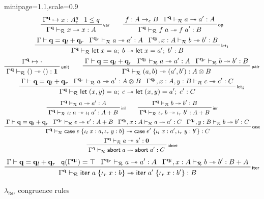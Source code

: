 \documentclass[acmsmall,screen,anonymous,review]{acmart}
\newcommand{\mc}[1]{\ensuremath{\mathcal{#1}}}
\newcommand{\mb}[1]{\ensuremath{\mathbf{#1}}}
\newcommand{\ms}[1]{\ensuremath{\mathsf{#1}}}
\newcommand{\lto}{:}
\newcommand{\linl}[1]{\iota_l\;{#1}}
\newcommand{\linr}[1]{\iota_r\;{#1}}
\newcommand{\labort}[1]{\ms{abort}\;{#1}}
\newcommand{\letexpr}[3]{\ensuremath{\ms{let}\;#1 = #2;\;#3}}
\newcommand{\caseexpr}[5]{\ms{case}\;#1\;\{\linl{#2} \lto #3, \linr{#4} \lto #5\}}
\newcommand{\liter}[3]{\ms{iter}\;#1\;\{ \linr{#2} \lto #3 \}}
\newcommand{\qsp}[4]{#1 \vdash #2 = #3 + #4}
\newcommand{\cwk}[2]{#1 \mapsto #2}
\newcommand{\rle}[1]{{\scriptsize\textsf{#1}}}
\newcommand{\tref}{\twoheadrightarrow}
\newcommand{\tmle}[5]{#1 \vdash_{#2} #3 \tref #4 : {#5}}
\newcommand{\subiterexp}{\texorpdfstring{\(\lambda_{\ms{iter}}\)}{lambda-iter}}
\newcommand{\alquant}{\ms{q}}
\begin{document}
\begin{figure}
  \begin{adjustbox}{minipage=1.1\textwidth,scale=0.9}
  \begin{gather*}
    \prftree[r]{\rle{var}}
      {\cwk{\Gamma^{\mb{q}}}{x : A^q_\epsilon}}
      {1 \leq q}
      {\tmle{\Gamma^{\mb{q}}}{\mc{R}}{x}{x}{A}} \qquad
    \prftree[r]{\rle{op}}
      {f : A \to_\epsilon B}
      {\tmle{\Gamma^{\mb{q}}}{\mc{R}}{a}{a'}{A}}
      {\tmle{\Gamma^{\mb{q}}}{\mc{R}}{f\;a}{f\;a'}{B}} \\
    \prftree[r]{\rle{let$_1$}}
      {\qsp{\Gamma}{\mb{q}}{\mb{q}_l}{\mb{q}_r}}
      {\tmle{\Gamma^{\mb{q}_r}}{\mc{R}}{a}{a'}{A}}
      {\tmle{\Gamma^{\mb{q}_l}, x : A}{\mc{R}}{b}{b'}{B}}
      {\tmle{\Gamma^{\mb{q}}}{\mc{R}}{\letexpr{x}{a}{b}}{\letexpr{x}{a'}{b'}}{B}} \\
    \prftree[r]{\rle{unit}}
      {\cwk{\Gamma^{\mb{q}}}{\cdot}}
      {\tmle{\Gamma^{\mb{q}}}{\mc{R}}{()}{()}{\mb{1}}} \qquad
    \prftree[r]{\rle{pair}}
      {\qsp{\Gamma}{\mb{q}}{\mb{q}_l}{\mb{q}_r}}
      {\tmle{\Gamma^{\mb{q}_l}}{\mc{R}}{a}{a'}{A}}
      {\tmle{\Gamma^{\mb{q}_r}}{\mc{R}}{b}{b'}{B}}
      {\tmle{\Gamma^{\mb{q}}}{\mc{R}}{(a, b)}{(a', b')}{A \otimes B}} \\
    \prftree[r]{\rle{let$_2$}}
      {\qsp{\Gamma}{\mb{q}}{\mb{q}_l}{\mb{q}_r}}
      {\tmle{\Gamma^{\mb{q}_r}}{\mc{R}}{a}{a'}{A \otimes B}}
      {\tmle{\Gamma^{\mb{q}_l}, x : A, y : B}{\mc{R}}{c}{c'}{C}}
      {\tmle{\Gamma^{\mb{q}}}{\mc{R}}{\letexpr{(x, y)}{a}{c}}{\letexpr{(x, y)}{a'}{c'}}{C}}
  \end{gather*}
  \begin{gather*}
    \prftree[r]{\rle{inl}}
      {\tmle{\Gamma^{\mb{q}}}{\mc{R}}{a}{a'}{A}}
      {\tmle{\Gamma^{\mb{q}}}{\mc{R}}{\linl{a}}{\linl{a'}}{A + B}} \qquad
    \prftree[r]{\rle{inr}}
      {\tmle{\Gamma^{\mb{q}}}{\mc{R}}{b}{b'}{B}}
      {\tmle{\Gamma^{\mb{q}}}{\mc{R}}{\linr{b}}{\linr{b'}}{A + B}} \\
    \prftree[r]{\rle{case}}
      {\qsp{\Gamma}{\mb{q}}{\mb{q}_l}{\mb{q}_r}}
      {\tmle{\Gamma^{\mb{q}_r}}{\mc{R}}{e}{e'}{A + B}}
      {\tmle{\Gamma^{\mb{q}_l}, x : A}{\mc{R}}{a}{a'}{C}}
      {\tmle{\Gamma^{\mb{q}_l}, y : B}{\mc{R}}{b}{b'}{C}}
      {\tmle{\Gamma^{\mb{q}}}{\mc{R}}
        {\caseexpr{e}{x}{a}{y}{b}}{\caseexpr{e'}{x}{a'}{y}{b'}}{C}} \\
    \prftree[r]{\rle{abort}}
      {\tmle{\Gamma^{\mb{q}}}{\mc{R}}{a}{a'}{\mb{0}}}
      {\tmle{\Gamma^{\mb{q}}}{\mc{R}}{\labort{a}}{\labort{a'}}{C}}
  \end{gather*}
  \begin{gather*}
    \prftree[r]{\rle{iter}}
      {\qsp{\Gamma}{\mb{q}}{\mb{q}_l}{\mb{q}_r}}
      {\alquant(\Gamma^{\mb{q}_l}) = \top}
      {\tmle{\Gamma^{\mb{q}_r}}{\mc{R}}{a}{a'}{A}}
      {\tmle{\Gamma^{\mb{q}_l}, x : A}{\mc{R}}{b}{b'}{B + A}}
      {\tmle{\Gamma^{\mb{q}}}{\mc{R}}{\liter{a}{x}{b}}{\liter{a'}{x}{b'}}{B}}
  \end{gather*}
  \end{adjustbox}
  \caption{\subiterexp{} congruence rules}
  \Description{}
  \label{fig:congruence-refinement}
\end{figure}
\end{document}
